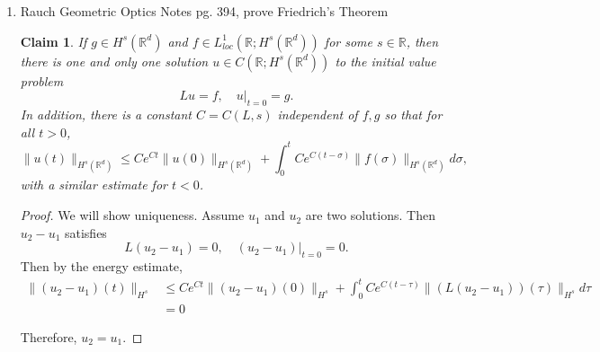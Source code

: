 \documentclass[a4paper]{article}
\newtheorem*{claim}{Claim}
\newcommand{\R}{\mathbb{R}}
\begin{document}
\begin{enumerate}
\begin{proof}
      This gives us
      \begin{align*}
	\int_{\R}^{} e^{4\pi \xi t} |\hat{g}(\xi)|^2 d\xi &\leq \liminf_{h \to 0} \int_{\R}^{} |\hat{u}^h(t,\xi)|^2 d\xi \quad \parbox{4cm}{by Fatou's Lemma} \\
	&= \liminf_{h \to 0} \|\hat{u}^h(t)\|_{L^2(\R)}^2 \\
	&= \liminf_{h \to 0} \|u^h(t)\|_{L^2(\R)}^2 \quad \parbox{4cm}{by Plancherel's Theorem}
      \end{align*}

    \end{proof}

  \item Rauch Geometric Optics Notes pg. 394, prove Friedrich's Theorem
    \begin{claim}
      If $g \in H^s(\R^d)$ and $f \in L^1_{loc}(\R; H^s(\R^d))$ for some $s \in \R$, then there is one and only one solution $u \in C(\R; H^s(\R^d))$ to the initial value problem
      \[ Lu = f, \quad u|_{t=0} = g. \]
      In addition, there is a constant $C = C(L,s)$ independent of $f, g$ so that for all $t>0$,
      \[ \|u(t)\|_{H^s(\R^d)} \leq C e^{Ct} \|u(0)\|_{H^s(\R^d)} + \int_{0}^{t} C e^{C(t-\sigma)} \|f(\sigma)\|_{H^s(\R^d)} d \sigma ,\]
      with a similar estimate for $t<0$.
    \end{claim}

    \begin{proof}
      We will show uniqueness. Assume $u_1$ and $u_2$ are two solutions. Then $u_2-u_1$ satisfies
      \[ L(u_2 - u_1) = 0, \quad (u_2-u_1)|_{t=0} = 0 .\]
      Then by the energy estimate,
      \begin{align*}
	\|(u_2-u_1)(t) \|_{H^s} &\leq C e^{Ct} \|(u_2-u_1)(0)\|_{H^s} + \int_{0}^{t} C e^{C(t-\tau)} \|(L(u_2-u_1))(\tau)\|_{H^s} d\tau \\
	&= 0
      \end{align*}

      Therefore, $u_2=u_1$.
    \end{proof}


\end{enumerate}
\end{document}
